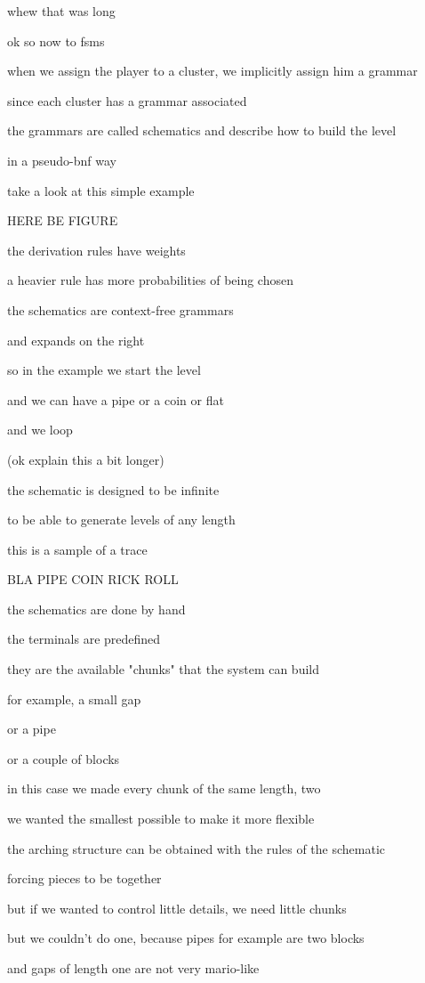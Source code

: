 \documentclass[conference]{IEEEtran}
\begin{document}
whew that was long

ok so now to fsms

when we assign the player to a cluster, we implicitly assign him a grammar

since each cluster has a grammar associated

the grammars are called schematics and describe how to build the level

in a pseudo-bnf way

take a look at this simple example

HERE BE FIGURE

the derivation rules have weights

a heavier rule has more probabilities of being chosen

the schematics are context-free grammars

and expands on the right

so in the example we start the level

and we can have a pipe or a coin or flat

and we loop

(ok explain this a bit longer)

the schematic is designed to be infinite

to be able to generate levels of any length

this is a sample of a trace

BLA PIPE COIN RICK ROLL

the schematics are done by hand

the terminals are predefined

they are the available "chunks" that the system can build

for example, a small gap

or a pipe

or a couple of blocks

in this case we made every chunk of the same length, two

we wanted the smallest possible to make it more flexible

the arching structure can be obtained with the rules of the schematic

forcing pieces to be together

but if we wanted to control little details, we need little chunks

but we couldn't do one, because pipes for example are two blocks

and gaps of length one are not very mario-like
\end{document}
